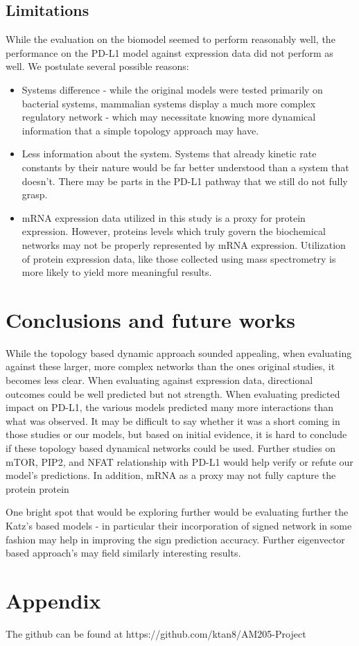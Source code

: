 \documentclass{article}
\begin{document}
\subsection{Limitations}
While the evaluation on the biomodel seemed to perform reasonably well, the performance on the PD-L1 model against expression data did not perform as well. We postulate several possible reasons: 
\begin{itemize}
    \item Systems difference - while the original models were tested primarily on bacterial systems, mammalian systems display a much more complex regulatory network - which may necessitate knowing more dynamical information that a simple topology approach may have. 
    \item Less information about the system. Systems that already kinetic rate constants by their nature would be far better understood than a system that doesn't. There may be parts in the PD-L1 pathway that we still do not fully grasp. 
    \item mRNA expression data utilized in this study is a proxy for protein expression. However, proteins levels which truly govern the biochemical networks may not be properly represented by mRNA expression. Utilization of protein expression data, like those collected using mass spectrometry is more likely to yield more meaningful results.
\end{itemize}

\section{Conclusions and future works}
While the topology based dynamic approach sounded appealing, when evaluating against these larger, more complex networks than the ones original studies, it becomes less clear. When evaluating against expression data, directional outcomes could be well predicted but not strength. When evaluating predicted impact on PD-L1, the various models predicted many more interactions than what was observed. It may be difficult to say whether it was a short coming in those studies or our models, but based on initial evidence, it is hard to conclude if these topology based dynamical networks could be used. Further studies on mTOR, PIP2, and NFAT relationship with PD-L1 would help verify or refute our model's predictions. In addition, mRNA as a proxy may not fully capture the protein protein 

One bright spot that would be exploring further would be evaluating further the Katz's based models - in particular their incorporation of signed network in some fashion may help in improving the sign prediction accuracy. Further eigenvector based approach's may field similarly interesting results. 



\section{Appendix}
The github can be found at https://github.com/ktan8/AM205-Project



\end{document}
